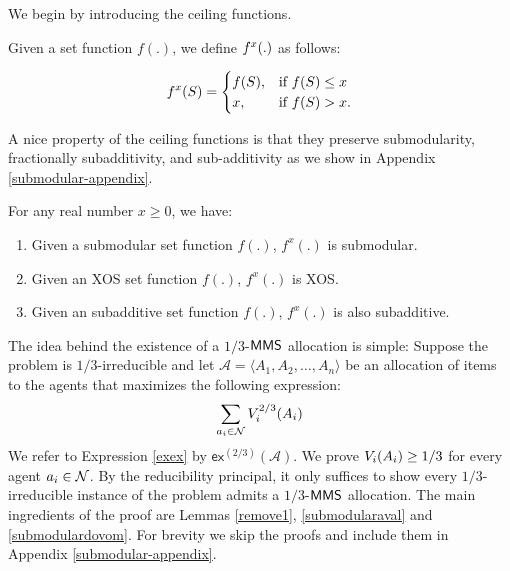 We begin by introducing the ceiling functions.
\begin{definition}\label{fxfunction}
	Given a set function $f(.)$, we define $f^{x}(.)$ as follows:
	
	$$f^{x}(S) =
	\begin{cases}
	f(S), & \text{if }f(S) \leq x \\
	x, & \text{if }f(S) > x.
	\end{cases}$$
\end{definition}
A nice property of the ceiling functions is that they preserve submodularity, fractionally subadditivity, and sub-additivity as we show in Appendix \ref{submodular-appendix}.

\begin{lemma}\label{ceilingfunctions}
	For any real number $x \geq 0$, we have:
	\begin{enumerate}
		\item Given a submodular set function $f(.)$, $f^x(.)$ is submodular.
		\item Given an XOS set function $f(.)$, $f^x(.)$ is XOS.
		\item Given an subadditive set function $f(.)$, $f^x(.)$ is also subadditive.
	\end{enumerate}
\end{lemma}

The idea behind the existence of a $1/3$-$\mathsf{MMS}$ allocation is simple: Suppose the problem is $1/3$-irreducible and let  $\mathcal{A} = \langle A_1, A_2, \ldots, A_n\rangle$ be an allocation of items to the agents that maximizes the following expression:
\begin{equation}\label{exex}
\sum_{a_i \in \mathcal{N}} V_i^{2/3}(A_i)
\end{equation}
We refer to Expression \eqref{exex} by $\mathsf{ex}^{(2/3)}(\mathcal{A})$. We prove $V_i(A_i) \geq 1/3$ for every agent $a_i \in \mathcal{N}$. By the reducibility principal, it only suffices to show every $1/3$-irreducible instance of the problem admits a $1/3$-$\mathsf{MMS}$ allocation. The main ingredients of the proof are Lemmas \ref{remove1}, \ref{submodularaval} and \ref{submodulardovom}. For brevity we skip the proofs and include them in Appendix \ref{submodular-appendix}.

